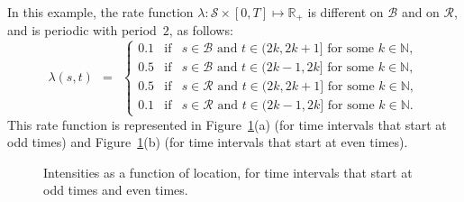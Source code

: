 \documentclass[article]{jss}
\newcommand{\NN}{\mathbb{N}}
\newcommand{\RR}{\mathbb{R}}
\begin{document}
In this example, the rate function $\lambda : \mathcal{S} \times [0,T] \mapsto \RR_{+}$ is different on $\mathcal{B}$ and on $\mathcal{R}$, and is periodic with period~$2$, as follows:
\[
\lambda(s,t) \ \ = \ \ \left\{\begin{array}{lcl}
0.1 & \mbox{if} & s \in \mathcal{B} \mbox{ and } t \in (2k,2k+1] \mbox{ for some } k \in \NN, \\
0.5 & \mbox{if} & s \in \mathcal{B} \mbox{ and } t \in (2k-1,2k] \mbox{ for some } k \in \NN, \\
0.5 & \mbox{if} & s \in \mathcal{R} \mbox{ and } t \in (2k,2k+1] \mbox{ for some } k \in \NN, \\
0.1 & \mbox{if} & s \in \mathcal{R} \mbox{ and } t \in (2k-1,2k] \mbox{ for some } k \in \NN.
\end{array}\right.
\]
This rate function is represented in Figure~\ref{figuresex1}(a) (for time intervals that start at odd times) and Figure~\ref{figuresex1}(b) (for time intervals that start at even times). 

\begin{figure}
\centering
\resizebox{\textwidth}{!}{
\begin{tabular}{cc}
\texttt{[image: lambdaconstanteven.pdf]} &
\texttt{[image: lambdaconstantodd.pdf]} \\
$\hspace*{0.6cm}$(a) Time intervals that start at odd times & $\hspace*{0.6cm}$(b) Time intervals that start at even times
\end{tabular}}
\caption{\label{figuresex1}
Intensities as a function of location, for time intervals that start at odd times and even times.}
\end{figure}
\end{document}
